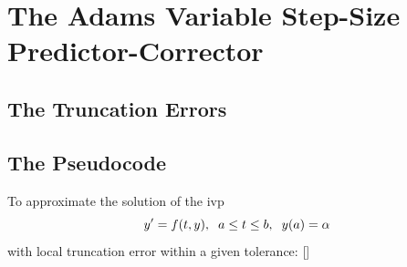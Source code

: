 \documentclass[12pt,oneside]{book}
\begin{document}
\begin{spacing}{1.2}
		\end{spacing}
		
		\clearpage
	\section{The Adams Variable Step-Size Predictor-Corrector} \label{m:abpcvs}
		\begin{spacing}{1.2}
			
			
			
			\subsection*{The Truncation Errors}
			
			
			\subsection*{The Pseudocode}
				To approximate the solution of the \ac{ivp} 
				\[ y' = f(t,y), \hspace*{0.2cm} a \leq t \leq b, \hspace*{0.2cm} y(a) = \alpha \]
				with local truncation error within a given tolerance: []
				

\end{spacing}
\end{document}
